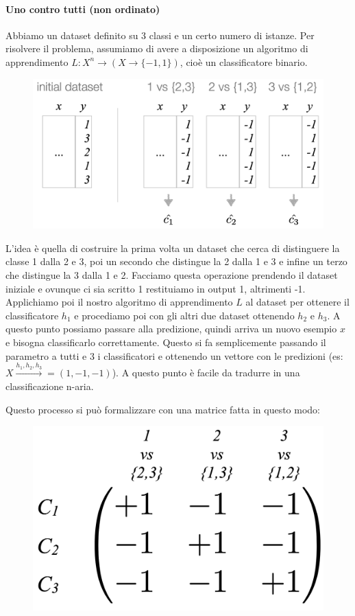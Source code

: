 \newpage
\paragraph{Uno contro tutti (non ordinato)} Abbiamo un dataset definito su 3 classi e un certo numero di istanze. Per risolvere il problema, assumiamo di avere a disposizione un algoritmo di apprendimento $L:X^n\rightarrow (X\rightarrow \{-1,1\} )$, cioè un classificatore binario.
\begin{figure}[!h]
    \centering
    \includegraphics[scale=0.5]{images/unordered1vAll.png}
\end{figure}


L'idea è quella di costruire la prima volta un dataset che cerca di distinguere la classe 1 dalla 2 e 3, poi un secondo che distingue la 2 dalla 1 e 3 e infine un terzo che distingue la 3 dalla 1 e 2. Facciamo questa operazione prendendo il dataset iniziale e ovunque ci sia scritto 1 restituiamo in output 1, altrimenti -1. Applichiamo poi il nostro algoritmo di apprendimento $L$ al dataset per ottenere il classificatore $h_1$ e procediamo poi con gli altri due dataset ottenendo $h_2$ e $h_3$. A questo punto possiamo passare alla predizione, quindi arriva un nuovo esempio $x$ e bisogna classificarlo correttamente. Questo si fa semplicemente passando il parametro a tutti e 3 i classificatori e ottenendo un vettore con le predizioni (es: $X\xrightarrow{h_1,h_2,h_3}=(1,-1,-1)$). A questo punto è facile da tradurre in una classificazione n-aria.

Questo processo si può formalizzare con una matrice fatta in questo modo:
\begin{figure}[!h]
    \centering
    \includegraphics[scale=0.4]{images/matrixDisord.png}
\end{figure}


